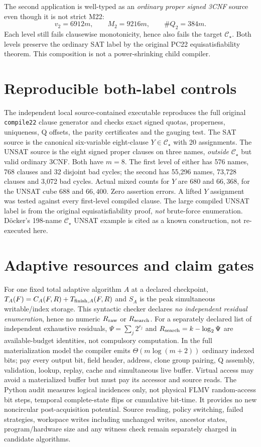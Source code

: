 \documentclass[11pt]{article}
\begin{document}
The second application is well-typed as an \emph{ordinary proper signed 3CNF} source even though it is not strict M22:
\begin{equation}
v_2=6912m,\qquad M_2=9216m,\qquad \#Q_2=384m.
\end{equation}
Each level still fails clausewise monotonicity, hence also fails the target $\mathcal C_\star$. Both levels preserve the ordinary SAT label by the original PC22 equisatisfiability theorem. This composition is not a power-shrinking child compiler.

\section{Reproducible both-label controls}
The independent local source-contained executable reproduces the full original \texttt{compile22} clause generator and checks exact signed quotas, properness, uniqueness, Q offsets, the parity certificates and the gauging test. The SAT source is the canonical six-variable eight-clause $Y\in\mathcal C_\star$ with 20 assignments. The UNSAT source is the eight signed proper clauses on three names, \emph{outside} $\mathcal C_\star$ but valid ordinary 3CNF. Both have $m=8$. The first level of either has 576 names, 768 clauses and 32 disjoint bad cycles; the second has 55,296 names, 73,728 clauses and 3,072 bad cycles. Actual mixed counts for $Y$ are $680$ and $66{,}368$, for the UNSAT cube $688$ and $66{,}400$. Zero assertion errors. A lifted $Y$ assignment was tested against every first-level compiled clause. The large compiled UNSAT label is from the original equisatisfiability proof, \emph{not} brute-force enumeration. D\"ocker's 198-name $\mathcal C_\star$ UNSAT example is cited as a known construction, not re-executed here.

\section{Adaptive resources and claim gates}
For one fixed total adaptive algorithm $A$ at a declared checkpoint,
$T_A(F)=C_A(F,R)+T_{{\rm finish},A}(F,R)$ and $S_A$ is the peak simultaneous writable/index storage. This syntactic checker declares \emph{no independent residual enumeration}, hence no numeric $R_{\rm raw}$ or $R_{\rm search}$. For a separately declared list of independent exhaustive residuals, $\Psi=\sum_j2^{r_j}$ and $R_{\rm search}=k-\log_2\Psi$ are available-budget identities, not compulsory computation. In the full materialization model the compiler emits $\Theta(m\log(m+2))$ ordinary indexed bits; pay every output bit, field header, address, clone group pairing, Q assembly, validation, lookup, replay, cache and simultaneous live buffer. Virtual access may avoid a materialized buffer but must pay its accessor and source reads. The Python audit measures logical incidences only, not physical FLMV random-access bit steps, temporal complete-state flips or cumulative bit-time. It provides no new noncircular post-acquisition potential. Source reading, policy switching, failed strategies, workspace writes including unchanged writes, ancestor states, program/hardware size and any witness check remain separately charged in candidate algorithms.
\end{document}
